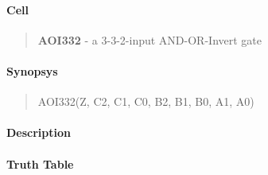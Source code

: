 \label{AOI332}
\paragraph{Cell}
\begin{quote}
    \textbf{AOI332} - a 3-3-2-input AND-OR-Invert gate
\end{quote}

\paragraph{Synopsys}
\begin{quote}
    AOI332(Z, C2, C1, C0, B2, B1, B0, A1, A0)
\end{quote}

\paragraph{Description}

%

\paragraph{Truth Table}


